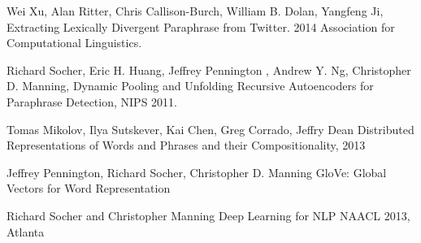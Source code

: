 \documentclass[conference]{IEEEtran}
\begin{document}
%
%
%
\begin{thebibliography}{1}

Wei Xu, Alan Ritter, Chris Callison-Burch, William B. Dolan, Yangfeng Ji, 
Extracting Lexically Divergent Paraphrase from Twitter. 
2014 Association for Computational Linguistics.

Richard Socher, Eric H. Huang, Jeffrey Pennington
, Andrew Y. Ng, Christopher D. Manning, Dynamic Pooling and Unfolding Recursive
Autoencoders for Paraphrase Detection, NIPS 2011.

Tomas Mikolov, Ilya Sutskever, Kai Chen,
Greg Corrado, Jeffry Dean
Distributed Representations of Words and Phrases
and their Compositionality, 2013

Jeffrey Pennington, Richard Socher, Christopher D. Manning
GloVe: Global Vectors for Word Representation

Richard Socher and Christopher Manning
Deep	 Learning for NLP
NAACL 2013, Atlanta


\end{thebibliography}




\end{document}
